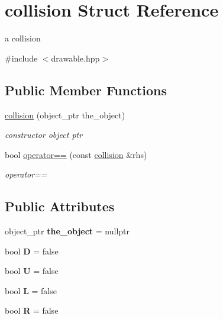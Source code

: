 \hypertarget{structcollision}{}\section{collision Struct Reference}
\label{structcollision}


a collision  




{\ttfamily \#include $<$drawable.\+hpp$>$}

\subsection*{Public Member Functions}
\begin{DoxyCompactItemize}
\item 
\hyperlink{structcollision_a8e4d3b4a9355c8946c0ad06ccc6e8d36}{collision} (object\+\_\+ptr the\+\_\+object)
\begin{DoxyCompactList}\small\item\em constructor object ptr \end{DoxyCompactList}\item 
bool \hyperlink{structcollision_ab1721e643a7906b3e4319a86315fce1b}{operator==} (const \hyperlink{structcollision}{collision} \&rhs)
\begin{DoxyCompactList}\small\item\em operator== \end{DoxyCompactList}\end{DoxyCompactItemize}
\subsection*{Public Attributes}
\begin{DoxyCompactItemize}
\item 
object\+\_\+ptr {\bfseries the\+\_\+object} = nullptr\hypertarget{structcollision_a7ed36890448403a8a50bf90565255e42}{}\label{structcollision_a7ed36890448403a8a50bf90565255e42}

\item 
bool {\bfseries D} = false\hypertarget{structcollision_a650a2bb40b437483c892b299c21920e8}{}\label{structcollision_a650a2bb40b437483c892b299c21920e8}

\item 
bool {\bfseries U} = false\hypertarget{structcollision_a01f73e208a2d2c858a157ab895a58509}{}\label{structcollision_a01f73e208a2d2c858a157ab895a58509}

\item 
bool {\bfseries L} = false\hypertarget{structcollision_ae07e40f8555ca518bf68ab3d85fcdb8e}{}\label{structcollision_ae07e40f8555ca518bf68ab3d85fcdb8e}

\item 
bool {\bfseries R} = false\hypertarget{structcollision_a89956863ae123b47eaf477b785a60a58}{}\label{structcollision_a89956863ae123b47eaf477b785a60a58}

\end{DoxyCompactItemize}


